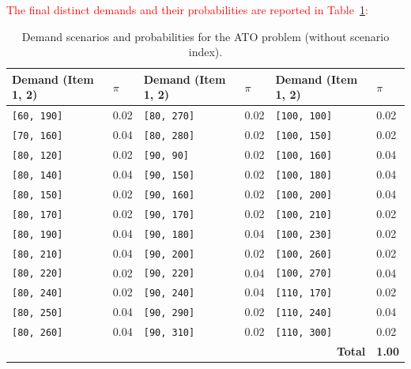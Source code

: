 \documentclass[a4paper,12pt]{article}
\begin{document}
	\textcolor{red}{The final distinct demands and their probabilities are reported in Table~\ref{tab:ato-general-results}:}
		
	\begin{table}[htbp]
		\centering
		\footnotesize
		\label{tab:ato-general-results}
		\renewcommand{\arraystretch}{1.1}
		\begin{tabular}{|@{\hskip 2pt}p{3.2cm}@{\hskip 2pt}|@{\hskip 2pt}p{1cm}@{\hskip 2pt}||@{\hskip 2pt}p{3.2cm}@{\hskip 2pt}|@{\hskip 2pt}p{1cm}@{\hskip 2pt}||@{\hskip 2pt}p{3.2cm}@{\hskip 2pt}|@{\hskip 2pt}p{1cm}@{\hskip 2pt}|}
			\hline
			\textbf{Demand (Item 1, 2)} & \textbf{$\pi$} &
			\textbf{Demand (Item 1, 2)} & \textbf{$\pi$} &
			\textbf{Demand (Item 1, 2)} & \textbf{$\pi$} \\
			\hline
			\texttt{[60, 190]}  & 0.02 & \texttt{[80, 270]} & 0.02 & \texttt{[100, 100]} & 0.02 \\
			\texttt{[70, 160]}  & 0.04 & \texttt{[80, 280]} & 0.02 & \texttt{[100, 150]} & 0.02 \\
			\texttt{[80, 120]}  & 0.02 & \texttt{[90, 90]}   & 0.02 & \texttt{[100, 160]} & 0.04 \\
			\texttt{[80, 140]}  & 0.04 & \texttt{[90, 150]}  & 0.02 & \texttt{[100, 180]} & 0.04 \\
			\texttt{[80, 150]}  & 0.02 & \texttt{[90, 160]}  & 0.02 & \texttt{[100, 200]} & 0.04 \\
			\texttt{[80, 170]}  & 0.02 & \texttt{[90, 170]}  & 0.02 & \texttt{[100, 210]} & 0.02 \\
			\texttt{[80, 190]}  & 0.04 & \texttt{[90, 180]}  & 0.04 & \texttt{[100, 230]} & 0.02 \\
			\texttt{[80, 210]}  & 0.04 & \texttt{[90, 200]}  & 0.02 & \texttt{[100, 260]} & 0.02 \\
			\texttt{[80, 220]}  & 0.02 & \texttt{[90, 220]}  & 0.04 & \texttt{[100, 270]} & 0.04 \\
			\texttt{[80, 240]}  & 0.02 & \texttt{[90, 240]}  & 0.04 & \texttt{[110, 170]} & 0.02 \\
			\texttt{[80, 250]}  & 0.04 & \texttt{[90, 290]}  & 0.02 & \texttt{[110, 240]} & 0.04 \\
			\texttt{[80, 260]}  & 0.04 & \texttt{[90, 310]}  & 0.02 & \texttt{[110, 300]} & 0.02 \\
			\hline
			\multicolumn{5}{|r|}{\textbf{Total}} & \textbf{1.00} \\
			\hline
		\end{tabular}
		\caption{Demand scenarios and probabilities for the ATO problem (without scenario index).}
	\end{table}
	
\end{document}
